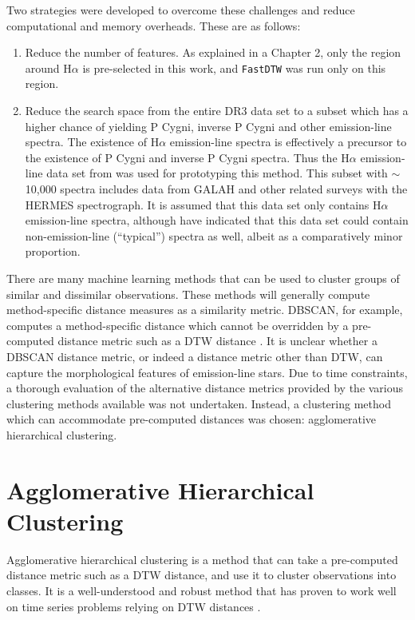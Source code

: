 Two strategies were developed to overcome these challenges and reduce computational and memory overheads. These are as follows:

\begin{enumerate}
    \item Reduce the number of features. As explained in a Chapter 2, only the region around H$\alpha$ is pre-selected in this work, and \texttt{FastDTW} was run only on this region.
    \item Reduce the search space from the entire DR3 data set to a subset which has a higher chance of yielding P Cygni, inverse P Cygni and other emission-line spectra. The existence of H$\alpha$ emission-line spectra is effectively a precursor to the existence of P Cygni and inverse P Cygni spectra. Thus the H$\alpha$ emission-line data set from \citet{vcotar2021galah} was used for prototyping this method. This subset with $\sim$ 10,000 spectra includes data from GALAH and other related surveys with the HERMES spectrograph. It is assumed that this data set only contains H$\alpha$ emission-line spectra, although  \citet{vcotar2021galah} have indicated that this data set  could contain non-emission-line (``typical'') spectra as well, albeit as a comparatively minor proportion. 
\end{enumerate}

There are many machine learning methods that can be used to cluster groups of similar and dissimilar observations. These methods will generally compute method-specific distance measures as a similarity metric. DBSCAN, for example, computes a method-specific distance which cannot be overridden by a pre-computed distance metric such as a DTW distance \citep{traven2017galah}. It is unclear whether a DBSCAN distance metric, or indeed a distance metric other than DTW, can capture the morphological features of emission-line stars. Due to time constraints, a thorough evaluation of the alternative distance metrics provided by the various clustering methods available was not undertaken. Instead, a clustering method which can accommodate pre-computed distances was chosen: agglomerative hierarchical clustering. 

\section{Agglomerative Hierarchical Clustering}

Agglomerative hierarchical clustering is a method that can take a pre-computed distance metric such as a DTW distance, and use it to cluster observations into classes. It is a well-understood and robust method that has proven to work well on time series problems relying on DTW distances \citep{nielsen2019practical}.

